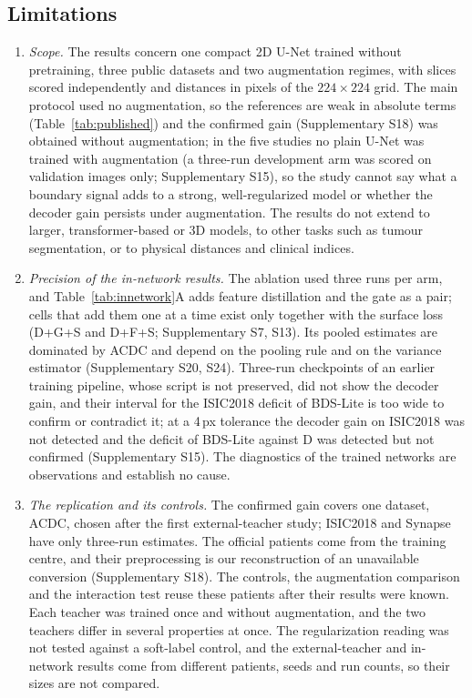 \documentclass[fleqn,10pt,lineno]{wlpeerj}
\begin{document}
\subsection*{Limitations}
\begin{enumerate}\setlength{\itemsep}{0pt}
\item \emph{Scope.} The results concern one compact 2D U-Net trained without pretraining, three public datasets and two augmentation regimes, with slices scored independently and distances in pixels of the $224\times224$ grid. The main protocol used no augmentation, so the references are weak in absolute terms (Table~\ref{tab:published}) and the confirmed gain (Supplementary S18) was obtained without augmentation; in the five studies no plain U-Net was trained with augmentation (a three-run development arm was scored on validation images only; Supplementary S15), so the study cannot say what a boundary signal adds to a strong, well-regularized model or whether the decoder gain persists under augmentation. The results do not extend to larger, transformer-based or 3D models, to other tasks such as tumour segmentation, or to physical distances and clinical indices.
\item \emph{Precision of the in-network results.} The ablation used three runs per arm, and Table~\ref{tab:innetwork}A adds feature distillation and the gate as a pair; cells that add them one at a time exist only together with the surface loss (D+G+S and D+F+S; Supplementary S7, S13). Its pooled estimates are dominated by ACDC and depend on the pooling rule and on the variance estimator (Supplementary S20, S24). Three-run checkpoints of an earlier training pipeline, whose script is not preserved, did not show the decoder gain, and their interval for the ISIC2018 deficit of BDS-Lite is too wide to confirm or contradict it; at a 4\,px tolerance the decoder gain on ISIC2018 was not detected and the deficit of BDS-Lite against D was detected but not confirmed (Supplementary S15). The diagnostics of the trained networks are observations and establish no cause.
\item \emph{The replication and its controls.} The confirmed gain covers one dataset, ACDC, chosen after the first external-teacher study; ISIC2018 and Synapse have only three-run estimates. The official patients come from the training centre, and their preprocessing is our reconstruction of an unavailable conversion (Supplementary S18). The controls, the augmentation comparison and the interaction test reuse these patients after their results were known. Each teacher was trained once and without augmentation, and the two teachers differ in several properties at once. The regularization reading was not tested against a soft-label control, and the external-teacher and in-network results come from different patients, seeds and run counts, so their sizes are not compared.
\end{enumerate}
\end{document}
